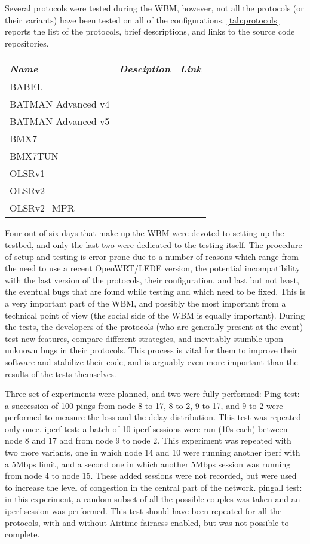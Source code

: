 \documentclass[10pt,onecolumn]{paper}
\begin{document}
Several protocols were tested during the WBM, however, not all the protocols (or their
variants) have been tested on all of the configurations. \cref{tab:protocols}
reports the list of the protocols, brief descriptions, and links to the
source code repositories. 

\begin{table}
    \centering
    \begin{tabular}{lll}
        \emph{Name} & \emph{Desciption} & \emph{Link} \\
        \midrule
        BABEL & & \\
        BATMAN Advanced v4 & & \\
        BATMAN Advanced v5 & & \\
        BMX7  & & \\
        BMX7TUN  & & \\
        OLSRv1 & & \\
        OLSRv2 & & \\
        OLSRv2\_MPR & & \\
        \bottomrule
    \end{tabular}
\end{table}

Four out of six days that make up the WBM were devoted to setting up the testbed, and
only the last two were dedicated to the testing itself. The procedure of setup
and testing is error prone due to a number of reasons which range from the need
to use a recent OpenWRT/LEDE version, the potential incompatibility with the
last version of the protocols, their configuration, and last but not least, the
eventual bugs that are found while testing and which need to be fixed. This is a very
important part of the WBM, and possibly the most important from a technical
point of view (the social side of the WBM is equally important). During the
tests, the developers of the protocols (who are generally present at the event)
test new features, compare different strategies, and inevitably stumble upon
unknown bugs in their protocols. This process is vital for them to improve their
software and stabilize their code, and is arguably even more important than the
results of the tests themselves. 

Three set of experiments were planned, and two were fully performed:
\bi
\ii Ping test: a succession of 100 pings from node 8 to 17, 8 to 2, 9 to 17, and 9
to 2 were performed to measure the loss and the delay distribution. This test
was repeated only once.
\ii iperf test: a batch of 10 iperf sessions were run (10s each) between node 8
and 17 and from node 9 to node 2. This experiment was repeated with two more
variants, one in which node 14 and 10 were running another iperf with a 5Mbps
limit, and a second one in which another 5Mbps session was running from node 4
to node 15. These added sessions were not recorded, but were used to increase
the level of congestion in the central part of the network.
\ii pingall test: in this experiment, a random subset of all the possible
couples was taken and an iperf session was performed. This test should have been
repeated for all the protocols, with and without Airtime fairness enabled, but
was not possible to complete.
\ei
\end{document}
